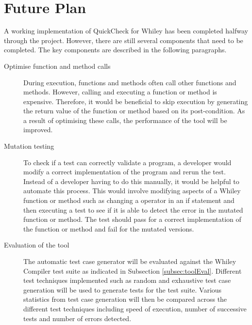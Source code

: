 \section{Future Plan}\label{section:future}


A working implementation of QuickCheck for Whiley has been completed halfway through the project. However, there are still several components that need to be completed. The key components are described in the following paragraphs.

\begin{description}
	\item[Optimise function and method calls]
	During execution, functions and methods often call other functions and methods.
	However, calling and executing a function or method is expensive.
	Therefore, it would be beneficial to skip execution by generating the return value of the function or method based on its post-condition.
	As a result of optimising these calls, the performance of the tool will be improved.
	\item[Mutation testing]
	To check if a test can correctly validate a program, a developer would modify a correct implementation of the program and rerun the test.
	Instead of a developer having to do this manually, it would be helpful to automate this process.
	This would involve modifying aspects of a Whiley function or method such as changing a operator in an if statement and then executing a test to see if it is able to detect the error in the mutated function or method.
	The test should pass for a correct implementation of the function or method and fail for the mutated versions.
	\item[Evaluation of the tool] The automatic test case generator will be evaluated against the Whiley Compiler test suite as indicated in Subsection \ref{subsec:toolEval}. Different test techniques implemented such as random and exhaustive test case generation will be used to generate tests for the test suite. Various statistics from test case generation will then be compared across the different test techniques including speed of execution, number of successive tests and number of errors detected.
\end{description}

